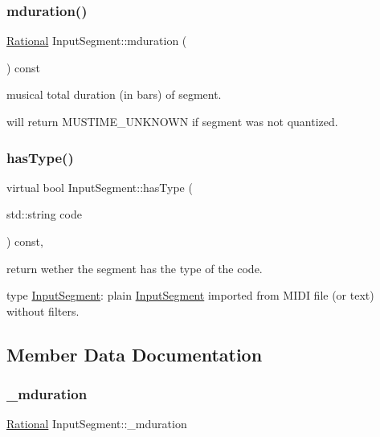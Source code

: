 \subsubsection{\texorpdfstring{mduration()}{mduration()}}
{\footnotesize\ttfamily \mbox{\hyperlink{classRational}{Rational}} Input\+Segment\+::mduration (\begin{DoxyParamCaption}{ }\end{DoxyParamCaption}) const\hspace{0.3cm}{\ttfamily [inline]}}



musical total duration (in bars) of segment. 

will return M\+U\+S\+T\+I\+M\+E\+\_\+\+U\+N\+K\+N\+O\+WN if segment was not quantized. \mbox{\label{classInputSegment_a3989ef5c44913cb1896920916cdcfcf8}} 
\subsubsection{\texorpdfstring{hasType()}{hasType()}}
{\footnotesize\ttfamily virtual bool Input\+Segment\+::has\+Type (\begin{DoxyParamCaption}\item[{std\+::string}]{code }\end{DoxyParamCaption}) const\hspace{0.3cm}{\ttfamily [inline]}, {\ttfamily [virtual]}}



return wether the segment has the type of the code. 

type \mbox{\hyperlink{classInputSegment}{Input\+Segment}}\+: plain \mbox{\hyperlink{classInputSegment}{Input\+Segment}} imported from M\+I\+DI file (or text) without filters. 

\subsection{Member Data Documentation}
\mbox{\label{classInputSegment_a0ab26fdbc02f67159a8f619254fa7440}} 
\subsubsection{\texorpdfstring{\_mduration}{\_mduration}}
{\footnotesize\ttfamily \mbox{\hyperlink{classRational}{Rational}} Input\+Segment\+::\+\_\+mduration\hspace{0.3cm}{\ttfamily [protected]}}



